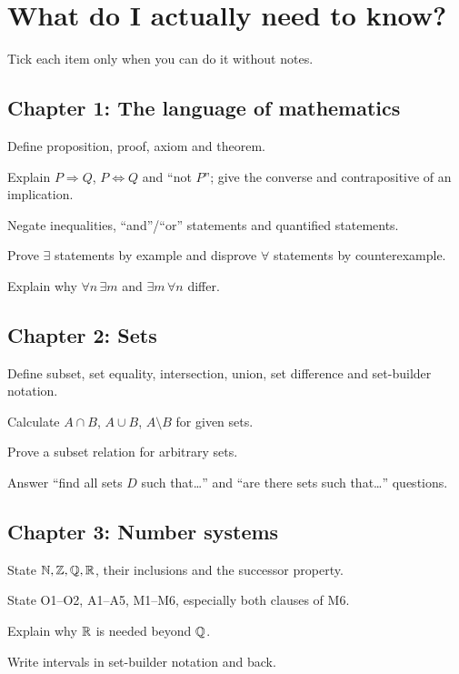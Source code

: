 \section*{What do I actually need to know?}

Tick each item only when you can do it without notes.

\subsection*{Chapter 1: The language of mathematics}
\begin{checklist}
  \item Define proposition, proof, axiom and theorem.
  \item Explain $P\Rightarrow Q$, $P\Leftrightarrow Q$ and ``not $P$''; give the converse and contrapositive of an implication.
  \item Negate inequalities, ``and''/``or'' statements and quantified statements.
  \item Prove $\exists$ statements by example and disprove $\forall$ statements by counterexample.
  \item Explain why $\forall n\,\exists m$ and $\exists m\,\forall n$ differ.
\end{checklist}
\subsection*{Chapter 2: Sets}
\begin{checklist}
  \item Define subset, set equality, intersection, union, set difference and set-builder notation.
  \item Calculate $A\cap B$, $A\cup B$, $A\setminus B$ for given sets.
  \item Prove a subset relation for arbitrary sets.
  \item Answer ``find all sets $D$ such that\dots'' and ``are there sets such that\dots'' questions.
\end{checklist}
\subsection*{Chapter 3: Number systems}
\begin{checklist}
  \item State $\mathbb{N},\mathbb{Z},\mathbb{Q},\mathbb{R}$, their inclusions and the successor property.
  \item State O1--O2, A1--A5, M1--M6, especially both clauses of M6.
  \item Explain why $\mathbb{R}$ is needed beyond $\mathbb{Q}$.
  \item Write intervals in set-builder notation and back.
\end{checklist}
